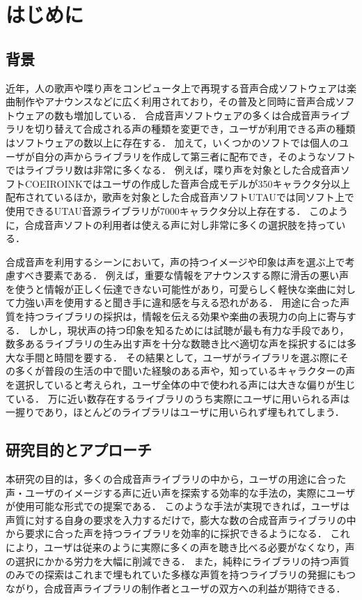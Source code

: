\chapter{はじめに}
\thispagestyle{myheadings}

\section{背景}
\label{sec:background}

近年，人の歌声や喋り声をコンピュータ上で再現する音声合成ソフトウェアは楽曲制作やアナウンスなどに広く利用されており，その普及と同時に音声合成ソフトウェアの数も増加している．
合成音声ソフトウェアの多くは合成音声ライブラリを切り替えて合成される声の種類を変更でき，ユーザが利用できる声の種類はソフトウェアの数以上に存在する．
加えて，いくつかのソフトでは個人のユーザが自分の声からライブラリを作成して第三者に配布でき，そのようなソフトではライブラリ数は非常に多くなる．
例えば，喋り声を対象とした合成音声ソフトCOEIROINKではユーザの作成した音声合成モデルが350キャラクタ分以上配布されている\cite{mycoeiroink}ほか，歌声を対象とした合成音声ソフトUTAUでは同ソフト上で使用できるUTAU音源ライブラリが7000キャラクタ分以上存在する\cite{vdbutau}．
このように，合成音声ソフトの利用者は使える声に対し非常に多くの選択肢を持っている．

合成音声を利用するシーンにおいて，声の持つイメージや印象は声を選ぶ上で考慮すべき要素である．
例えば，重要な情報をアナウンスする際に滑舌の悪い声を使うと情報が正しく伝達できない可能性があり，可愛らしく軽快な楽曲に対して力強い声を使用すると聞き手に違和感を与える恐れがある．
用途に合った声質を持つライブラリの採択は，情報を伝える効果や楽曲の表現力の向上に寄与する．
しかし，現状声の持つ印象を知るためには試聴が最も有力な手段であり，数多あるライブラリの生み出す声を十分な数聴き比べ適切な声を採択するには多大な手間と時間を要する．
その結果として，ユーザがライブラリを選ぶ際にその多くが普段の生活の中で聞いた経験のある声や，知っているキャラクターの声を選択していると考えられ，ユーザ全体の中で使われる声には大きな偏りが生じている．
万に近い数存在するライブラリのうち実際にユーザに用いられる声は一握りであり，ほとんどのライブラリはユーザに用いられず埋もれてしまう．

\section{研究目的とアプローチ}
本研究の目的は，多くの合成音声ライブラリの中から，ユーザの用途に合った声・ユーザのイメージする声に近い声を探索する効率的な手法の，実際にユーザが使用可能な形式での提案である．
このような手法が実現できれば，ユーザは声質に対する自身の要求を入力するだけで，膨大な数の合成音声ライブラリの中から要求に合った声を持つライブラリを効率的に採択できるようになる．
これにより，ユーザは従来のように実際に多くの声を聴き比べる必要がなくなり，声の選択にかかる労力を大幅に削減できる．
また，純粋にライブラリの持つ声質のみでの探索はこれまで埋もれていた多様な声質を持つライブラリの発掘にもつながり，合成音声ライブラリの制作者とユーザの双方への利益が期待できる．

